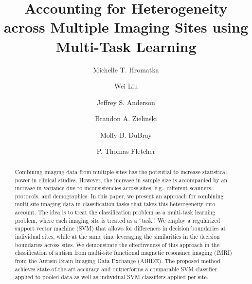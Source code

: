 \documentclass{llncs}
\begin{document}
\pagestyle{plain}

\mainmatter

\title{Accounting for Heterogeneity across Multiple Imaging Sites using Multi-Task
  Learning}
%
%
\author{Michelle T. Hromatka \and Wei Liu  \and Jeffrey S. Anderson \and Brandon A. Zielinski \and Molly B. DuBray \and P. Thomas Fletcher}


\maketitle

\begin{abstract}
Combining imaging data from multiple sites has the potential to increase
statistical power in clinical studies. However, the increase in sample size is
accompanied by an increase in variance due to inconsistencies across sites,
e.g., different scanners, protocols, and demographics. In this paper, we present
an approach for combining multi-site imaging data in classification tasks that
takes this heterogeneity into account. The idea is to treat the classification
problem as a multi-task learning problem, where each imaging site is treated as
a ``task''. We employ a regularized support vector machine (SVM) that allows for
differences in decision boundaries at individual sites, while at the same time
leveraging the similarities in the decision boundaries across sites. We
demonstrate the effectiveness of this approach in the classification of autism
from multi-site functional magnetic resonance imaging (fMRI) from the Autism
Brain Imaging Data Exchange (ABIDE). The proposed method achieves
state-of-the-art accuracy and outperforms a comparable SVM classifier applied to
pooled data as well as individual SVM classifiers applied per site.

\end{abstract}
\end{document}
